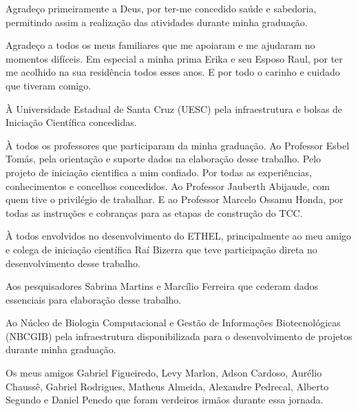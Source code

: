 \begin{agradecimentos}
Agradeço primeiramente a Deus, por ter-me concedido saúde e sabedoria, permitindo assim a realização das atividades durante minha graduação.

Agradeço a todos os meus familiares que me apoiaram e me ajudaram no momentos difíceis. Em especial a minha prima Erika e seu Esposo Raul, por ter me acolhido na sua residência todos esses anos. E por todo o carinho e cuidado que tiveram comigo.  

À Universidade Estadual de Santa Cruz (UESC) pela infraestrutura e bolsas de Iniciação Científica concedidas.

À todos os professores que participaram da minha graduação. Ao Professor Esbel Tomás, pela orientação e suporte dados na elaboração desse trabalho. Pelo projeto de iniciação cientifica a mim confiado. Por todas as experiências, conhecimentos e concelhos concedidos. Ao Professor Jauberth Abijaude, com quem tive o privilégio de trabalhar. E ao Professor Marcelo Ossamu Honda, por todas as instruções e cobranças para as etapas de construção do TCC.

À todos envolvidos no desenvolvimento do ETHEL, principalmente ao meu amigo e colega de iniciação científica Raí Bizerra que teve participação direta no desenvolvimento desse trabalho.

Aos pesquisadores Sabrina Martins e Marcílio Ferreira que cederam dados essenciais para elaboração desse trabalho.

Ao Núcleo de Biologia Computacional e Gestão de Informações Biotecnológicas (NBCGIB) pela infraestrutura disponibilizada para o desenvolvimento de projetos durante minha graduação.

Os meus amigos Gabriel Figueiredo, Levy Marlon, Adson Cardoso, Aurélio Chaussê, Gabriel Rodrigues, Matheus Almeida, Alexandre Pedrecal, Alberto Segundo e Daniel Penedo que foram verdeiros irmãos durante essa jornada.







\end{agradecimentos}
